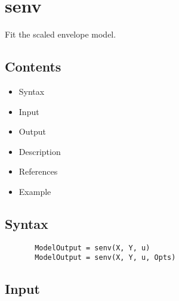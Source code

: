 \documentclass[a4paper,11pt,openany]{memoir}
\begin{document}
\newpage

\rmfamily
\color{black}\section{senv}

\begin{par}
Fit the scaled envelope model.
\end{par} \vspace{1em}

\subsection*{Contents}

\begin{itemize}
\setlength{\itemsep}{-1ex}
   \item Syntax
   \item Input
   \item Output
   \item Description
   \item References
   \item Example
\end{itemize}


\subsection*{Syntax}


\begin{verbatim}       ModelOutput = senv(X, Y, u)
       ModelOutput = senv(X, Y, u, Opts)\end{verbatim}
    

\subsection*{Input}
\end{document}

